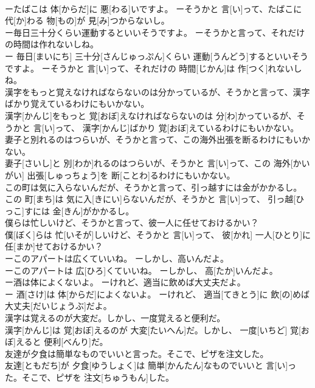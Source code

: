 \documentclass[8pt]{extreport}
\begin{document}
\begin{CJK}{UTF8}{min}
\\	ーたばこは 体[からだ]に 悪[わる]いですよ。 ーそうかと 言[い]って、たばこに 代[か]わる 物[もの]が 見[み]つからないし。
\\	ー毎日三十分くらい運動するといいそうですよ。 ーそうかと言って、それだけの時間は作れないしね。	
\\	ー 毎日[まいにち] 三十分[さんじゅっぷん]くらい 運動[うんどう]するといいそうですよ。 ーそうかと 言[い]って、それだけの 時間[じかん]は 作[つく]れないしね。
\\	漢字をもっと覚えなければならないのは分かっているが、そうかと言って、漢字ばかり覚えているわけにもいかない。	
\\	漢字[かんじ]をもっと 覚[おぼ]えなければならないのは 分[わ]かっているが、そうかと 言[い]って、 漢字[かんじ]ばかり 覚[おぼ]えているわけにもいかない。
\\	妻子と別れるのはつらいが、そうかと言って、この海外出張を断るわけにもいかない。	
\\	妻子[さいし]と 別[わか]れるのはつらいが、そうかと 言[い]って、この 海外[かいがい] 出張[しゅっちょう]を 断[ことわ]るわけにもいかない。
\\	この町は気に入らないんだが、そうかと言って、引っ越すには金がかかるし。	
\\	この 町[まち]は 気に入[きにい]らないんだが、そうかと 言[い]って、 引っ越[ひっこ]すには 金[きん]がかかるし。
\\	僕らは忙しいけど、そうかと言って、彼一人に任せておけるかい？	
\\	僕[ぼく]らは 忙[いそが]しいけど、そうかと 言[い]って、 彼[かれ] 一人[ひとり]に 任[まか]せておけるかい？
\\	ーこのアパートは広くていいね。 ーしかし、高いんだよ。	
\\	ーこのアパートは 広[ひろ]くていいね。 ーしかし、 高[たか]いんだよ。
\\	ー酒は体によくないよ。 ーけれど、適当に飲めば大丈夫だよ。	
\\	ー 酒[さけ]は 体[からだ]によくないよ。 ーけれど、 適当[てきとう]に 飲[の]めば 大丈夫[だいじょうぶ]だよ。
\\	漢字は覚えるのが大変だ。しかし、一度覚えると便利だ。	
\\	漢字[かんじ]は 覚[おぼ]えるのが 大変[たいへん]だ。しかし、 一度[いちど] 覚[おぼ]えると 便利[べんり]だ。
\\	友達が夕食は簡単なものでいいと言った。そこで、ピザを注文した。	
\\	友達[ともだち]が 夕食[ゆうしょく]は 簡単[かんたん]なものでいいと 言[い]った。そこで、ピザを 注文[ちゅうもん]した。

\end{CJK}
\end{document}

